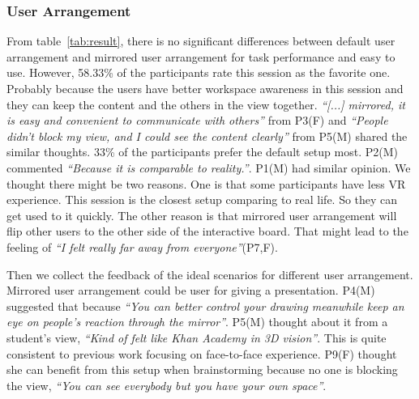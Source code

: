 \documentclass{sigchi}
\begin{document}
\subsubsection{User Arrangement}
From table~\ref{tab:result}, there is no significant differences between default user arrangement and mirrored user arrangement for task performance and easy to use. However, 58.33\% of the participants rate this session as the favorite one. Probably because the users have better workspace awareness in this session and they can keep the content and the others in the view together. \textit{``[...] mirrored, it is easy and convenient to communicate with others''} from P3(F) and \textit{``People didn't block my view, and I could see the content clearly''} from P5(M) shared the similar thoughts. 33\% of the participants prefer the default setup most. P2(M) commented \textit{``Because it is comparable to reality.''}. P1(M) had similar opinion. We thought there might be two reasons. One is that some participants have less VR experience. This session is the closest setup comparing to real life. So they can get used to it quickly. The other reason is that mirrored user arrangement will flip other users to the other side of the interactive board. That might lead to the feeling of \textit{``I felt really far away from everyone''}(P7,F).

Then we collect the feedback of the ideal scenarios for different user arrangement. Mirrored user arrangement could be user for giving a presentation. P4(M) suggested that because \textit{``You can better control your drawing meanwhile keep an eye on people's reaction through the mirror''}. P5(M) thought about it from a student's view, \textit{``Kind of felt like Khan Academy in 3D vision''}. This is quite consistent to previous work focusing on face-to-face experience. P9(F) thought she can benefit from this setup when brainstorming because no one is blocking the view, \textit{``You can see everybody but you have your own space''}.
\end{document}
